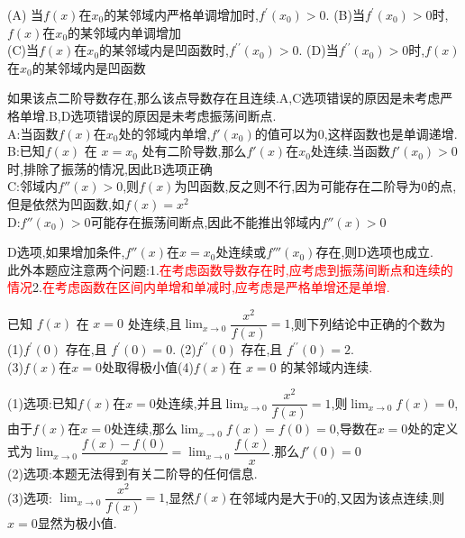 \documentclass[8pt a4paper, oneside, UTF8]{ctexbook}  %
\begin{document}
\begin{sloppypar}
\begin{problem}
    (A) 当$f(x)$在$x_0$的某邻域内严格单调增加时,$f^\prime(x_0)>0.$
    (B)当$f^\prime(x_0)>0$时,$f(x)$在$x_0$的某邻域内单调增加\\
    (C)当$f(x)$在$x_0$的某邻域内是凹函数时,$f^{\prime\prime}(x_0)>0.$
    (D)当$f^{\prime\prime}(x_0)>0$时,$f(x)$在$x_0$的某邻域内是凹函数
    \end{problem}
    \begin{solution}
        如果该点二阶导数存在,那么该点导数存在且连续.A,C选项错误的原因是未考虑严格单增.B,D选项错误的原因是未考虑振荡间断点.\\
        A:当函数$f(x)$在$x_0$处的邻域内单增,$f'(x_0)$的值可以为0,这样函数也是单调递增.\\
        B:已知$f(x)$ 在 $x=x_0$ 处有二阶导数,那么$f'(x)$在$x_0$处连续.当函数$f'(x_0)>0$时,排除了振荡的情况,因此B选项正确\\
        C:邻域内$f''(x)>0$,则$f(x)$为凹函数,反之则不行,因为可能存在二阶导为0的点,但是依然为凹函数,如$f(x)=x^2$\\
        D:$f''(x_0)>0$可能存在振荡间断点,因此不能推出邻域内$f''(x)>0$
    \end{solution}
    \begin{note}
        D选项,如果增加条件,$f''(x)$在$x=x_0$处连续或$f'''(x_0)$存在,则D选项也成立.\\此外本题应注意两个问题:1.\textcolor{red}{在考虑函数导数存在时,应考虑到振荡间断点和连续的情况}2.\textcolor{red}{在考虑函数在区间内单增和单减时,应考虑是严格单增还是单增.}
    \end{note}
    \begin{problem}
    已知 $f(x)$ 在 $x=0$ 处连续,且$\lim_{x\to 0}\dfrac{x^2}{f(x)}=1$,则下列结论中正确的个数为\\
    (1)$f^{\prime}(0)$ 存在,且 $f^\prime(0)=0.$ \quad (2)$f^{\prime\prime}(0)$ 存在,且 $f^{\prime\prime}(0)=2.$\\
    (3)$f(x)$在$x=0$处取得极小值\quad (4)$f\left(x\right)$在 $x=0$ 的某邻域内连续.
    \end{problem}
    \begin{solution}
        (1)选项:已知$f(x)$在$x=0$处连续,并且$\lim_{x\to 0}\dfrac{x^2}{f(x)}=1$,则$\lim_{x\to 0}f(x) =0$,由于$f(x)$在$x=0$处连续,那么$\lim_{x \to 0}f(x)=f(0)=0$,导数在$x=0$处的定义式为$\lim_{x\to 0}\dfrac{f(x)-f(0)}{x}=\lim_{x\to 0} \dfrac{f(x)}{x}$.那么$f'(0)=0$\\
        (2)选项:本题无法得到有关二阶导的任何信息.\\
        (3)选项: $\lim_{x\to 0} \dfrac{x^2}{f(x)}=1$,显然$f(x)$在邻域内是大于0的,又因为该点连续,则$x=0$显然为极小值. \\

\end{solution}
\end{sloppypar}
\end{document}
